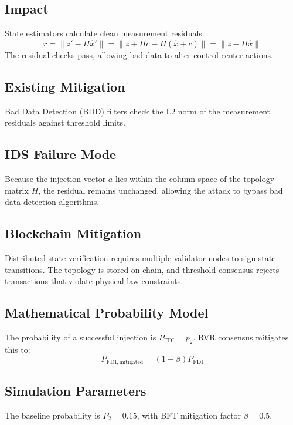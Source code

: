 \documentclass[12pt, oneside, a4paper]{report}
\theoremstyle{definition}
\theoremstyle{remark}
\begin{document}
\subsection{Impact}
State estimators calculate clean measurement residuals:
\begin{equation}
r = \| z' - H \hat{x}' \| = \| z + H c - H(\hat{x} + c) \| = \| z - H \hat{x} \|
\end{equation}
The residual checks pass, allowing bad data to alter control center actions.

\subsection{Existing Mitigation}
Bad Data Detection (BDD) filters check the L2 norm of the measurement residuals against threshold limits.

\subsection{IDS Failure Mode}
Because the injection vector $a$ lies within the column space of the topology matrix $H$, the residual remains unchanged, allowing the attack to bypass bad data detection algorithms.

\subsection{Blockchain Mitigation}
Distributed state verification requires multiple validator nodes to sign state transitions. The topology is stored on-chain, and threshold consensus rejects transactions that violate physical law constraints.

\subsection{Mathematical Probability Model}
The probability of a successful injection is $P_{\mathrm{FDI}} = p_2$. RVR consensus mitigates this to:
\begin{equation}
P_{\mathrm{FDI,mitigated}} = (1 - \beta) P_{\mathrm{FDI}}
\end{equation}

\subsection{Simulation Parameters}
The baseline probability is $P_2 = 0.15$, with BFT mitigation factor $\beta = 0.5$.

\bigskip
\end{document}
